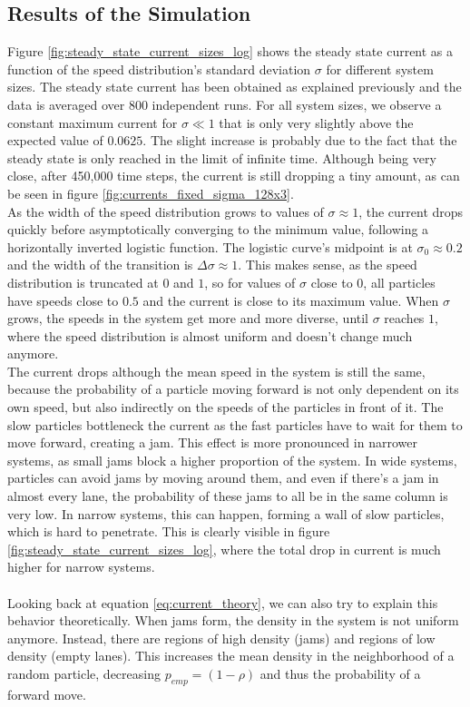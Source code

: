 \subsection{Results of the Simulation}
\label{sec:results_simulation_current_sigma_size}
Figure \ref{fig:steady_state_current_sizes_log} shows the steady state current as a function of the speed distribution's standard deviation $\sigma$ for different system sizes. The steady state current has been obtained as explained previously and the data is averaged over 800 independent runs. For all system sizes, we observe a constant maximum current for $\sigma \ll 1$ that is only very slightly above the expected value of $0.0625$. The slight increase is probably due to the fact that the steady state is only reached in the limit of infinite time. Although being very close, after 450,000 time steps, the current is still dropping a tiny amount, as can be seen in figure \ref{fig:currents_fixed_sigma_128x3}. 
\\
As the width of the speed distribution grows to values of $\sigma \approx 1$, the current drops quickly before asymptotically converging to the minimum value, following a horizontally inverted logistic function. The logistic curve's midpoint is at $\sigma_0 \approx 0.2$ and the width of the transition is $\Delta \sigma \approx 1$. This makes sense, as the speed distribution is truncated at $0$ and $1$, so for values of $\sigma$ close to $0$, all particles have speeds close to $0.5$ and the current is close to its maximum value. When $\sigma$ grows, the speeds in the system get more and more diverse, until $\sigma$ reaches $1$, where the speed distribution is almost uniform and doesn't change much anymore. 
\\
The current drops although the mean speed in the system is still the same, because the probability of a particle moving forward is not only dependent on its own speed, but also indirectly on the speeds of the particles in front of it. The slow particles bottleneck the current as the fast particles have to wait for them to move forward, creating a jam. This effect is more pronounced in narrower systems, as small jams block a higher proportion of the system. In wide systems, particles can avoid jams by moving around them, and even if there's a jam in almost every lane, the probability of these jams to all be in the same column is very low. In narrow systems, this can happen, forming a wall of slow particles, which is hard to penetrate. This is clearly visible in figure \ref{fig:steady_state_current_sizes_log}, where the total drop in current is much higher for narrow systems. 
\\
\\
Looking back at equation \ref{eq:current_theory}, we can also try to explain this behavior theoretically. When jams form, the density in the system is not uniform anymore. Instead, there are regions of high density (jams) and regions of low density (empty lanes). This increases the mean density in the neighborhood of a random particle, decreasing $p_{emp}=(1-\rho)$ and thus the probability of a forward move.  


